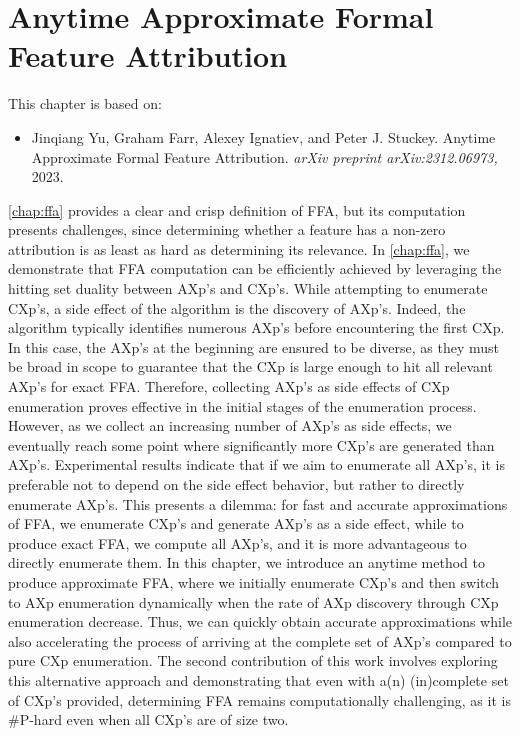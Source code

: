 \chapter{Anytime Approximate Formal Feature Attribution}\label{chap:marco}


This chapter is based on:
\begin{itemize}
	\item Jinqiang Yu, Graham Farr, Alexey Ignatiev, and Peter J. Stuckey. Anytime Approximate Formal
Feature Attribution. \emph{arXiv preprint arXiv:2312.06973,} 2023.
\end{itemize}

\autoref{chap:ffa} provides a clear and crisp definition of FFA, but its computation presents
challenges,
since determining whether a feature has a non-zero attribution is as
least as hard as determining its relevance.
%
In \autoref{chap:ffa}, we demonstrate that FFA computation can be efficiently achieved 
by leveraging the hitting set duality between AXp's and CXp's.
%
While attempting to enumerate CXp's, a side effect of the algorithm is 
the discovery of AXp's. 
%
Indeed, the algorithm typically identifies numerous AXp's before encountering the first CXp.
%
In this case, the AXp's at the beginning are ensured to be diverse, as they must be broad in scope
to guarantee that the CXp is large enough to hit all relevant AXp's for exact FFA.
%
Therefore, collecting AXp's as side effects of CXp enumeration proves effective in the 
initial stages of the enumeration process.
%
However, as we collect an increasing number of AXp's as side effects, we eventually 
reach some point where significantly more CXp's are generated than AXp's.
%
Experimental results indicate that if we aim to enumerate all AXp's, it is preferable not to 
depend on the side effect behavior, but rather to directly enumerate AXp's.
%
This presents a dilemma: for fast and accurate approximations of FFA, we enumerate CXp's and
generate AXp's as a side effect, while to produce exact FFA, we compute all AXp's, and it is more 
advantageous to directly enumerate them.
%
In this chapter, we introduce an anytime method to produce approximate FFA,
where we initially enumerate CXp's and then switch to AXp enumeration dynamically 
when the rate of AXp discovery through CXp enumeration decrease.
%
Thus, we can quickly obtain accurate approximations while also accelerating the process of 
arriving at the complete set of AXp's compared to pure CXp enumeration.
%
The second contribution of this work involves exploring this alternative approach 
and demonstrating that even with a(n) (in)complete set of CXp's provided, 
determining FFA remains computationally challenging, as it is \#P-hard even when 
all CXp's are of size two.


%



